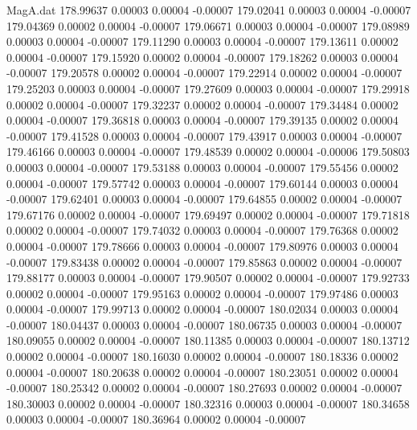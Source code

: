 \begin{filecontents}{MagA.dat}
 178.99637    0.00003    0.00004   -0.00007
 179.02041    0.00003    0.00004   -0.00007
 179.04369    0.00002    0.00004   -0.00007
 179.06671    0.00003    0.00004   -0.00007
 179.08989    0.00003    0.00004   -0.00007
 179.11290    0.00003    0.00004   -0.00007
 179.13611    0.00002    0.00004   -0.00007
 179.15920    0.00002    0.00004   -0.00007
 179.18262    0.00003    0.00004   -0.00007
 179.20578    0.00002    0.00004   -0.00007
 179.22914    0.00002    0.00004   -0.00007
 179.25203    0.00003    0.00004   -0.00007
 179.27609    0.00003    0.00004   -0.00007
 179.29918    0.00002    0.00004   -0.00007
 179.32237    0.00002    0.00004   -0.00007
 179.34484    0.00002    0.00004   -0.00007
 179.36818    0.00003    0.00004   -0.00007
 179.39135    0.00002    0.00004   -0.00007
 179.41528    0.00003    0.00004   -0.00007
 179.43917    0.00003    0.00004   -0.00007
 179.46166    0.00003    0.00004   -0.00007
 179.48539    0.00002    0.00004   -0.00006
 179.50803    0.00003    0.00004   -0.00007
 179.53188    0.00003    0.00004   -0.00007
 179.55456    0.00002    0.00004   -0.00007
 179.57742    0.00003    0.00004   -0.00007
 179.60144    0.00003    0.00004   -0.00007
 179.62401    0.00003    0.00004   -0.00007
 179.64855    0.00002    0.00004   -0.00007
 179.67176    0.00002    0.00004   -0.00007
 179.69497    0.00002    0.00004   -0.00007
 179.71818    0.00002    0.00004   -0.00007
 179.74032    0.00003    0.00004   -0.00007
 179.76368    0.00002    0.00004   -0.00007
 179.78666    0.00003    0.00004   -0.00007
 179.80976    0.00003    0.00004   -0.00007
 179.83438    0.00002    0.00004   -0.00007
 179.85863    0.00002    0.00004   -0.00007
 179.88177    0.00003    0.00004   -0.00007
 179.90507    0.00002    0.00004   -0.00007
 179.92733    0.00002    0.00004   -0.00007
 179.95163    0.00002    0.00004   -0.00007
 179.97486    0.00003    0.00004   -0.00007
 179.99713    0.00002    0.00004   -0.00007
 180.02034    0.00003    0.00004   -0.00007
 180.04437    0.00003    0.00004   -0.00007
 180.06735    0.00003    0.00004   -0.00007
 180.09055    0.00002    0.00004   -0.00007
 180.11385    0.00003    0.00004   -0.00007
 180.13712    0.00002    0.00004   -0.00007
 180.16030    0.00002    0.00004   -0.00007
 180.18336    0.00002    0.00004   -0.00007
 180.20638    0.00002    0.00004   -0.00007
 180.23051    0.00002    0.00004   -0.00007
 180.25342    0.00002    0.00004   -0.00007
 180.27693    0.00002    0.00004   -0.00007
 180.30003    0.00002    0.00004   -0.00007
 180.32316    0.00003    0.00004   -0.00007
 180.34658    0.00003    0.00004   -0.00007
 180.36964    0.00002    0.00004   -0.00007

\end{filecontents}
